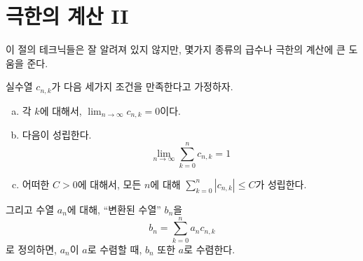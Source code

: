 \section{극한의 계산 II} %
이 절의 테크닉들은 잘 알려져 있지 않지만, 몇가지 종류의 급수나 극한의 계산에 큰 도움을 준다.
\begin{theorem}[Toeplitz]
\label{thm:toeplitztrans}  
    실수열 $c_{n, k}$가 다음 세가지 조건을 만족한다고 가정하자.
    \begin{enumerate}[(a)]
        \item 각 $k$에 대해서, $ \lim_{n \to \infty} c_{n, k} = 0$이다.
        \item 다음이 성립한다.
        \begin{equation*}
            \lim_{n \to \infty} \sum_{k = 0}^n c_{n, k} = 1
        \end{equation*}
        \item 어떠한 $C > 0$에 대해서, 모든 $n$에 대해 $\sum_{k = 0}^n |c_{n, k}| \leq C$가 성립한다.
    \end{enumerate}
    그리고 수열 $a_n$에 대해, ``변환된 수열'' $b_n$을
    \begin{equation*}
        b_n = \sum_{k = 0}^n a_n c_{n, k}
    \end{equation*}
    로 정의하면, $a_n$이 $a$로 수렴할 때, $b_n$ 또한 $a$로 수렴한다.
\end{theorem}
